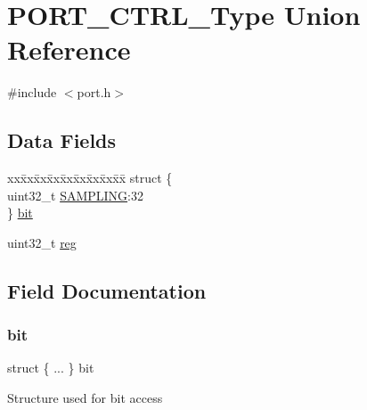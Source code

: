 \hypertarget{union_p_o_r_t___c_t_r_l___type}{}\section{P\+O\+R\+T\+\_\+\+C\+T\+R\+L\+\_\+\+Type Union Reference}
\label{union_p_o_r_t___c_t_r_l___type}


{\ttfamily \#include $<$port.\+h$>$}

\subsection*{Data Fields}
\begin{DoxyCompactItemize}
\item 
\begin{tabbing}
xx\=xx\=xx\=xx\=xx\=xx\=xx\=xx\=xx\=\kill
struct \{\\
\>uint32\_t \mbox{\hyperlink{union_p_o_r_t___c_t_r_l___type_ae2db552edfe72e233d4d623c738aea95}{SAMPLING}}:32\\
\} \mbox{\hyperlink{union_p_o_r_t___c_t_r_l___type_a5c09df9a43b170c9de5a1f096b29a46c}{bit}}\\

\end{tabbing}\item 
uint32\+\_\+t \mbox{\hyperlink{union_p_o_r_t___c_t_r_l___type_a6b91636401516a477989a336376d7b40}{reg}}
\end{DoxyCompactItemize}


\subsection{Field Documentation}
\mbox{\label{union_p_o_r_t___c_t_r_l___type_a5c09df9a43b170c9de5a1f096b29a46c}} 
\subsubsection{\texorpdfstring{bit}{bit}}
{\footnotesize\ttfamily struct \{ ... \}   bit}

Structure used for bit access \mbox{\label{union_p_o_r_t___c_t_r_l___type_a6b91636401516a477989a336376d7b40}} 
